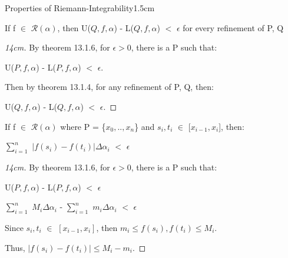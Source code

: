     \vspace{0.5cm}



    \begin{ltheorem}{Properties of Riemann-Integrability}{1.5cm}
        \item If f $\in$ $\mathscr{R}(\alpha)$, then
        U($Q,f,\alpha$) - L($Q,f,\alpha$) $<$ $\epsilon$ for 
        every refinement of P, Q

            \begin{proof}[14cm]
                By {\color{red} theorem 13.1.6}, for $\epsilon > 0$, there is a P
                such that:
                
                \hspace{0.5cm}
                U($P,f,\alpha$) - L($P,f,\alpha$) $<$ $\epsilon$.

                Then by {\color{red} theorem 13.1.4},
                for any refinement of P, Q, then:
                
                \hspace{0.5cm}
                U($Q,f,\alpha$) - L($Q,f,\alpha$) $<$ $\epsilon$.
            \end{proof}

        
        \item If f $\in$ $\mathscr{R}(\alpha)$ where
            P = \{$x_0,..,x_n$\} and $s_i,t_i$ $\in$ [$x_{i-1},x_i$],
            then:
        
            \hspace{1cm}
            $\sum_{i=1}^n$ $|f(s_i) - f(t_i)| \Delta \alpha_i$ $<$ $\epsilon$

            \begin{proof}[14cm]
                By {\color{red} theorem 13.1.6}, for $\epsilon > 0$,
                there is a P such that:

                \hspace{0.5cm}
                U($P,f,\alpha$) - L($P,f,\alpha$) $<$ $\epsilon$

                \hspace{0.5cm}
                $\sum_{i=1}^n$ $M_i \Delta \alpha_i$
                - $\sum_{i=1}^n$ $m_i \Delta \alpha_i$
                $<$ $\epsilon$

                Since $s_i,t_i$ $\in$ $[x_{i-1},x_i]$, then
                $m_i \leq f(s_i),f(t_i) \leq M_i$.

                Thus, $|f(s_i) - f(t_i)| \leq M_i - m_i$.


\end{proof}
\end{ltheorem}
